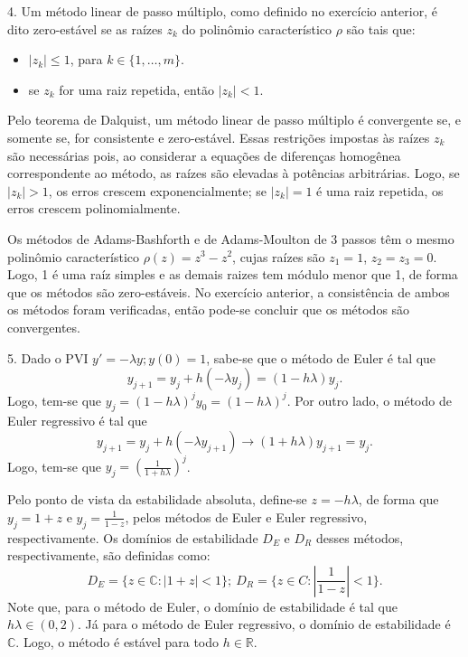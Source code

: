 \documentclass[10pt,a4paper]{article}
\newcommand{\R}{\mathbb{R}}
\newcommand{\C}{\mathbb{C}}
\newcommand{\separator}{\noindent\makebox[\textwidth]{\rule{\textwidth}{0.4pt}}}
\newcommand{\vs}{\vspace{0.2cm}}
\begin{document}
\separator

\vs
4. Um método linear de passo múltiplo, como definido no exercício anterior, é dito zero-estável se as raízes $z_k$ do polinômio característico $\rho$ são tais que:
\begin{itemize}
	\item $|z_k| \leq 1$, para $k \in \{1, \dots, m\}$.

	\item se $z_k$ for uma raiz repetida, então $|z_k| < 1$.
\end{itemize}
Pelo teorema de Dalquist, um método linear de passo múltiplo é convergente se, e somente se, for consistente e zero-estável. Essas restrições impostas às raízes $z_k$ são necessárias pois, ao considerar a equações de diferenças homogênea correspondente ao método, as raízes são elevadas à potências arbitrárias. Logo, se $|z_k| > 1$, os erros crescem exponencialmente; se $|z_k| = 1$ é uma raiz repetida, os erros crescem polinomialmente.

Os métodos de Adams-Bashforth e de Adams-Moulton de 3 passos têm o mesmo polinômio característico $\rho(z) = z^3 - z^2$, cujas raízes são $z_1 = 1$, $z_2 = z_3 = 0$. Logo, 1 é uma raíz simples e as demais raizes tem módulo menor que 1, de forma que os métodos são zero-estáveis. No exercício anterior, a consistência de ambos os métodos foram verificadas, então pode-se concluir que os métodos são convergentes.



\separator

\vs
5. Dado o PVI $y' = -\lambda y; y(0) = 1$, sabe-se que o método de Euler é tal que
\[y_{j + 1} = y_j + h (-\lambda y_j) = (1 - h \lambda) y_j.\]
Logo, tem-se que $y_j = (1 - h \lambda)^j y_0 = (1 - h \lambda)^j$. Por outro lado, o método de Euler regressivo é tal que
\[y_{j + 1} = y_j + h (-\lambda y_{j + 1}) \to (1 + h \lambda) y_{j + 1} = y_j.\]
Logo, tem-se que $y_j = \left( \frac{1}{1 + h \lambda} \right)^j$.

Pelo ponto de vista da estabilidade absoluta, define-se $z = -h \lambda$, de forma que $y_j = 1 + z$ e $y_j = \frac{1}{1 - z}$, pelos métodos de Euler e Euler regressivo, respectivamente. Os domínios de estabilidade $D_E$ e $D_R$ desses métodos, respectivamente, são definidas como:
\[D_E = \{z \in \C: |1 + z| < 1\}; \ D_R = \{z \in C: \left| \frac{1}{1 - z} \right| < 1\}.\]
Note que, para o método de Euler, o domínio de estabilidade é tal que $h \lambda \in (0, 2)$. Já para o método de Euler regressivo, o domínio de estabilidade é $\C$. Logo, o método é estável para todo $h \in \R$.
\end{document}
